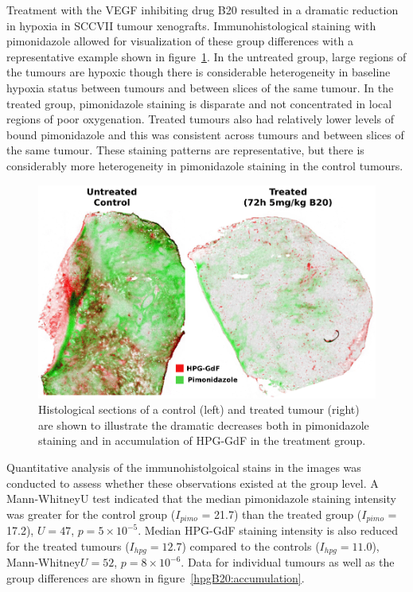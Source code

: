 Treatment with the \acs{VEGF} inhibiting drug B20 resulted in a dramatic reduction in hypoxia in SCCVII tumour xenografts.
Immunohistological staining with pimonidazole allowed for visualization of these group differences with a representative example shown in figure~\ref{hpgB20:histohpgpimo}.
In the untreated group, large regions of the tumours are hypoxic though there is considerable heterogeneity in baseline hypoxia status between tumours and between slices of the same tumour.
In the treated group, pimonidazole staining is disparate and not concentrated in local regions of poor oxygenation.
Treated tumours also had relatively lower levels of bound pimonidazole and this was consistent across tumours and between slices of the same tumour.
These staining patterns are representative, but there is considerably more heterogeneity in pimonidazole staining in the control tumours.

\begin{figure}[htbp] %
  \centering
  \includegraphics[width=\textwidth]{hpg/hpg-B20-images/histo_hpgPimo.png} 
  \captionsetup{width=\linewidth}
  \caption{Histological sections of a control (left) and treated tumour (right) are shown to illustrate the dramatic decreases both in pimonidazole staining and in accumulation of \acs{HPG-GdF} in the treatment group.}
  \label{hpgB20:histohpgpimo}
\end{figure}

Quantitative analysis of the immunohistolgoical stains in the images was conducted to assess whether these observations existed at the group level. 
A Mann-WhitneyU test indicated that the median pimonidazole staining intensity was greater for the control group ($I_{pimo}$ = 21.7) than the treated group ($I_{pimo}$ = 17.2), $U = 47$, $p = 5\times10^{-5}$.
Median \acs{HPG-GdF} staining intensity is also reduced for the treated tumours ($I_{hpg} = 12.7$) compared to the controls ($I_{hpg} =11.0$), Mann-Whitney$U=52$, $p = 8\times10^{-6}$.
Data for individual tumours as well as the group differences are shown in figure~\ref{hpgB20:accumulation}.

